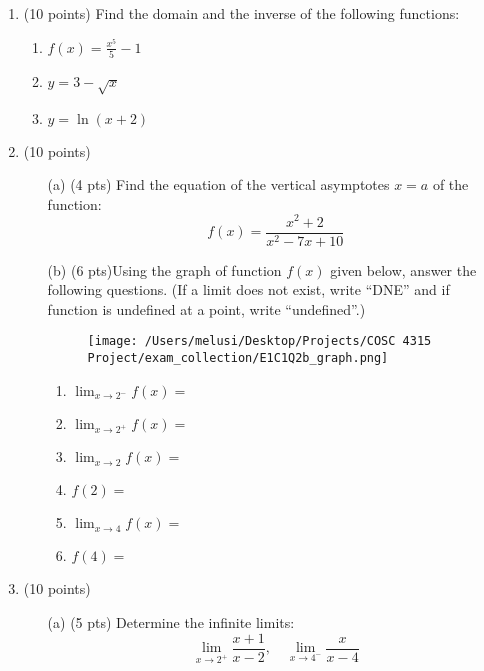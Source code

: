 \documentclass[12pt]{article}
\begin{document}
\vspace{1cm}

\begin{enumerate}
    \item (10 points) Find the domain and the inverse of the following functions:
    \begin{enumerate}
        \item \( f(x) = \frac{x^5}{5} - 1 \)
        \item \( y = 3 - \sqrt{x} \)
        \item \( y = \ln(x + 2) \)
    \end{enumerate}

\item (10 points)
\begin{enumerate}
    \item[(a)] (4 pts) Find the equation of the vertical asymptotes \(x = a\) of the function:  
    \[
    f(x) = \frac{x^2 + 2}{x^2 - 7x + 10}
    \]
    \item[(b)] (6 pts)Using the graph of function \( f(x) \) given below, answer the following questions.
        (If a limit does not exist, write “DNE” and if function is undefined at a point, write “undefined”.)
    \begin{figure}[ht!]
        \centering
        \texttt{[image: /Users/melusi/Desktop/Projects/COSC 4315 Project/exam\_collection/E1C1Q2b\_graph.png]}
    \end{figure}

        \begin{enumerate}
            \item \( \lim_{x \to 2^-} f(x) = \)
            \item \( \lim_{x \to 2^+} f(x) = \)
            \item \( \lim_{x \to 2} f(x) = \)
            \item \( f(2) = \)
            \item \( \lim_{x \to 4} f(x) = \)
            \item \( f(4) = \)
        \end{enumerate}
    \end{enumerate}

    \item (10 points)
    \begin{enumerate}
        \item [(a)] (5 pts) Determine the infinite limits:
        \[
        \lim_{x \to 2^+} \frac{x + 1}{x - 2}, \quad 
        \lim_{x \to 4^-} \frac{x}{x - 4}
        \]


\end{enumerate}
\end{enumerate}
\end{document}
